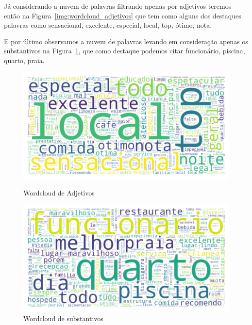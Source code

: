 Já considerando a nuvem de palavras filtrando apenas por adjetivos teremos então na Figura~\ref{img:wordcloud_adjetivos} que tem como alguns dos destaques palavras como sensacional, excelente, especial, local, top, ótimo, nota.

E por último observamos a nuvem de palavras levando em consideração apenas os substantivos na Figura~\ref{img:wordcloud_substantivos}, que como destaque podemos citar funcionário, piscina, quarto, praia.

\begin{figure}
	\centering
	\begin{minipage}{0.45\textwidth}
		\centering
		\includegraphics[width=1\textwidth]{figs/exploratoria/wordcloud_adjetivos.png}
		\caption{Wordcloud de Adjetivos}
		\label{img:wordcloud_adjetivos}
	\end{minipage}
	\begin{minipage}{0.45\textwidth}
		\centering
		\includegraphics[width=1\textwidth]{figs/exploratoria/wordcloud_substantivos.png}
		\caption{Wordcloud de substantivos}
		\label{img:wordcloud_substantivos}
	\end{minipage}
\end{figure}


